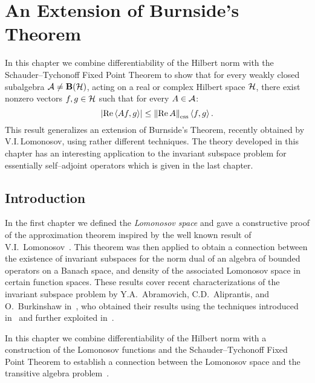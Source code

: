 \def\baselinestretch{1}

\chapter{An Extension of Burnside's Theorem}

\def\baselinestretch{1.66}



In this chapter we combine differentiability of the Hilbert norm with the
Schauder--Tychonoff Fixed Point Theorem to show that for every weakly closed
subalgebra ${\cal A}\neq\mathbf B(\cal H)$, acting on a real or complex Hilbert space ${\cal H}$, there
exist nonzero vectors $f,g\in{\cal H}$ such that for every $A\in{\cal A}$:
\[ \abs{\RE\seq{A f,g}}\leq\essnorm{\RE A}\seq{f,g}. \]
This result generalizes an extension of Burnside's Theorem, recently obtained
by V.I.\,Lomonosov, using rather different techniques. The theory developed
in this chapter has an interesting application to the invariant subspace
problem for essentially self--adjoint operators which is given in the last
chapter.

\goodbreak
\section{Introduction}

In the first chapter we defined the {\em Lomonosov space} and gave a
constructive proof of the approximation theorem inspired by the well known
result of V.I.~Lomonosov~\cite{Lom73}. This theorem was then applied to
obtain a connection between the existence of invariant subspaces for the norm
dual of an algebra of bounded operators on a Banach space, and density of the
associated Lomonosov space in certain function spaces. These results cover
recent characterizations of the invariant subspace problem by
Y.A.~Abramovich, C.D.~Aliprantis, and O.~Burkinshaw in~\cite{AAB95}, who
obtained their results using the techniques introduced in~\cite{Lom91} and
further exploited in~\cite{dB93}.

\medskip

In this chapter we combine differentiability of the Hilbert norm with a
construction of the Lomonosov functions and the Schauder--Tychonoff Fixed
Point Theorem to establish a connection between the Lomonosov space and the
transitive algebra problem~\cite{RR73}.

